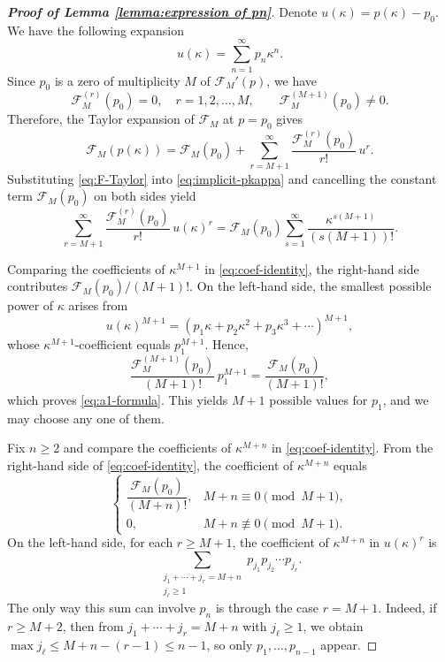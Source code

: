\documentclass[preprint,3p,10pt]{elsarticle}
\theoremstyle{definition}
\begin{document}
\begin{proof}[\bf Proof of Lemma \ref{lemma:expression of pn}]
Denote $u(\kappa)=p(\kappa)-p_0$. We have the following expansion
\begin{equation}
    u(\kappa)=\sum_{n=1}^{\infty}p_n\kappa^n.
\end{equation}
Since \(p_0\) is a zero of multiplicity \(M\) of
\(\mathcal F_M'(p)\), we have
\begin{equation}
\mathcal F_M^{(r)}(p_0)=0,
\quad r=1,2,\ldots,M,
\qquad
\mathcal F_M^{(M+1)}(p_0)\neq0.
\end{equation}
Therefore, the Taylor expansion of \(\mathcal F_M\) at \(p=p_0\)
gives
\begin{equation}\label{eq:F-Taylor}
\mathcal{F}_M(p(\kappa))
=\mathcal{F}_M(p_0)
+\sum_{r=M+1}^{\infty}\frac{\mathcal{F}_M^{(r)}(p_0)}{r!}\,u^r.
\end{equation}
Substituting \eqref{eq:F-Taylor} into \eqref{eq:implicit-pkappa} and cancelling the constant term
$\mathcal{F}_M(p_0)$ on both sides yield
\begin{equation}\label{eq:coef-identity}
\sum_{r=M+1}^{\infty}\frac{\mathcal{F}_M^{(r)}(p_0)}{r!}\,u(\kappa)^r
=
\mathcal{F}_M(p_0)\sum_{s=1}^{\infty}\frac{\kappa^{s(M+1)}}{(s(M+1))!}.
\end{equation}


Comparing the coefficients of $\kappa^{M+1}$ in \eqref{eq:coef-identity}, the right-hand side
contributes $\mathcal{F}_M(p_0)/(M+1)!$. On the left-hand side, the smallest possible power of
$\kappa$ arises from
\[
u(\kappa)^{M+1}=\left(p_1\kappa+p_2\kappa^2+p_3\kappa^3+\cdots\right)^{M+1},
\]
whose $\kappa^{M+1}$-coefficient equals $p_1^{M+1}$. Hence,
\[
\frac{\mathcal{F}_M^{(M+1)}(p_0)}{(M+1)!}\,p_1^{M+1}
=
\frac{\mathcal{F}_M(p_0)}{(M+1)!},
\]
which proves \eqref{eq:a1-formula}. This yields $M+1$ possible values for $p_1$, and we may choose any one of them.

 
Fix $n\ge 2$ and compare the coefficients of $\kappa^{M+n}$ in \eqref{eq:coef-identity}. From the right-hand side of \eqref{eq:coef-identity}, the coefficient of $\kappa^{M+n}$ equals
\begin{equation}
    \begin{cases}
\dfrac{\mathcal{F}_M(p_0)}{(M+n)!}, & M+n \equiv 0 \pmod{M+1}, \\[1ex]
0, & M+n \not \equiv 0 \pmod{M+1}.
\end{cases}
\end{equation}
On the left-hand side, for each $r\ge M+1$, the coefficient of $\kappa^{M+n}$ in $u(\kappa)^r$ is
\begin{equation}\label{eqn:coefficients in the left hand side}
    \sum_{\substack{j_1+\cdots+j_r=M+n\\ j_\ell\ge 1}}
p_{j_1}p_{j_2}\cdots p_{j_r}.
\end{equation}
The only way this sum can involve $p_n$ is through the case $r=M+1$. Indeed, if $r\ge M+2$, then
from $j_1+\cdots+j_r=M+n$ with $j_\ell\ge 1$, we obtain
$\max j_\ell\le M+n-(r-1)\le n-1$, so only $p_1,\dots,p_{n-1}$ appear.


\end{proof}
\end{document}
